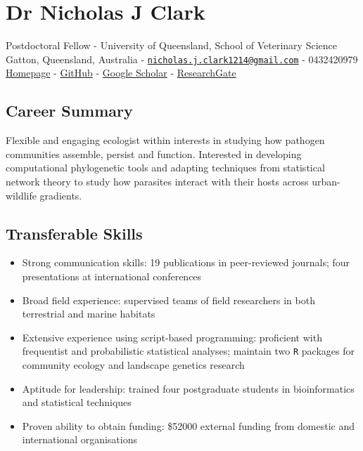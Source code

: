 \documentclass[]{article}
\title{}
\author{}
\date{}
\providecommand{\tightlist}{%
  \setlength{\itemsep}{0pt}\setlength{\parskip}{0pt}}
\begin{document}
\section{Dr Nicholas J Clark}\label{dr-nicholas-j-clark}

Postdoctoral Fellow - University of Queensland, School of Veterinary
Science\\
Gatton, Queensland, Australia -
\href{mailto:nicholas.j.clark1214@gmail.com}{\nolinkurl{nicholas.j.clark1214@gmail.com}}
- 0432420979\\
\href{http://nicholasjclark.weebly.com/}{Homepage} -
\href{https://github.com/nicholasjclark}{GitHub} -
\href{https://scholar.google.com.au/citations?hl=en\&user=5bO9uxEAAAAJ\&view_op=list_works\&gmla=AJsN-F7bdYY9zcTVOHPEOVWZOJmCtgWpcxs_93x6Nxu1saXGdZjQLZ9byuM7Bdln9uk-HvNvAG1pThmdF6m_XgubeW0Q2sVTsjvpgou00G94hSHvb99iNTk}{Google
Scholar} -
\href{https://www.researchgate.net/profile/Nicholas_Clark4}{ResearchGate}

\subsection{Career Summary}\label{career-summary}

Flexible and engaging ecologist within interests in studying how
pathogen communities assemble, persist and function. Interested in
developing computational phylogenetic tools and adapting techniques from
statistical network theory to study how parasites interact with their
hosts across urban-wildlife gradients.

\subsection{Transferable Skills}\label{transferable-skills}

\begin{itemize}
\tightlist
\item
  Strong communication skills: 19 publications in peer-reviewed
  journals; four presentations at international conferences
\item
  Broad field experience: supervised teams of field researchers in both
  terrestrial and marine habitats
\item
  Extensive experience using script-based programming: proficient with
  frequentist and probabilistic statistical analyses; maintain two
  \texttt{R} packages for community ecology and landscape genetics
  research
\item
  Aptitude for leadership: trained four postgraduate students in
  bioinformatics and statistical techniques
\item
  Proven ability to obtain funding: \$52000 external funding from
  domestic and international organisations
\end{itemize}
\end{document}
